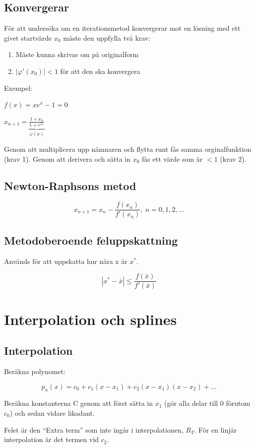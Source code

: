 \documentclass[12pt,a4paper]{article}
\begin{document}
\subsection{Konvergerar}
För att undersöka om en iterationsmetod konvergerar mot en lösning med ett givet startvärde $x_0$ måste den uppfylla två krav:
\begin{enumerate}
	\item{Måste kunna skrivas om på originalform}
	\item{$ |\varphi' (x_0) | < 1 $ för att den ska konvergera}
\end{enumerate}
Exempel:

$ f(x) = xe^x-1 = 0 $

$ x_{n+1} = \underbrace{\frac{1 + x_n}{1 + e^{x_n}}}_\text{$\varphi(x)$}$

Genom att multiplicera upp nämnaren och flytta runt fås samma orginalfunktion (krav 1). Genom att derivera och sätta in $x_0$ fås ett värde som är $< 1$ (krav 2).

\subsection{Newton-Raphsons metod}
$$ x_{n+1} = x_n - \frac{f(x_n)}{f'(x_n)}, \: n = 0,1,2,\ldots $$

\subsection{Metodoberoende feluppskattning}
Används för att uppskatta hur nära x är $x^*$.

$$ |x^{*}-\bar{x}| \leq \frac{f(\bar{x})}{f'(\bar{x})} $$

\section{Interpolation och splines}
\subsection{Interpolation}

Beräkna polynomet:

$$ p_n(x) = c_0 + c_1(x-x_1) + c_2 (x-x_1)(x-x_2) + \ldots $$

Beräkna konstanterna C genom att först sätta in $x_1$ (gör alla delar till 0 förutom $c_0$) och sedan vidare likadant.

Felet är den ``Extra term'' som inte ingår i interpolationen, $R_T$.
För en linjär interpolation är det termen vid $c_2$.
\end{document}
